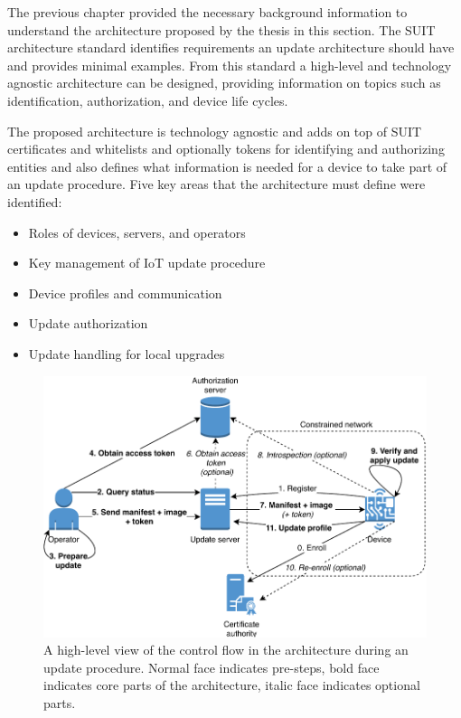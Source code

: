 \documentclass[0-thesis.tex]{subfiles}
\begin{document}
The previous chapter provided the necessary background information to understand the
architecture proposed by the thesis in this section. The SUIT architecture standard
identifies requirements an update architecture should have and provides minimal examples.
From this standard a high-level and technology agnostic architecture can be designed,
providing information on topics such as identification, authorization, and device life
cycles. 

The proposed architecture is technology agnostic and adds on top of SUIT certificates and
whitelists and optionally tokens for identifying and authorizing entities and also defines
what information is needed for a device to take part of an update procedure. Five key
areas that the architecture must define were identified:

\begin{itemize}
    \item Roles of devices, servers, and operators
    \item Key management of IoT update procedure
    \item Device profiles and communication
    \item Update authorization
    \item Update handling for local upgrades
\end{itemize}

\begin{figure}[t]
    \caption{A high-level view of the control flow in the architecture during an update
    procedure. Normal face indicates pre-steps, bold face indicates core parts of the architecture, italic face indicates optional parts.}
    \label{fig:communication-workflow}
    \includegraphics{images/update-flow.pdf}
\end{figure}
\end{document}
